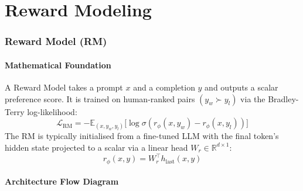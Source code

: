\newpage
\part{Reward Modeling}

\section{Reward Model (RM)}

\subsection{Mathematical Foundation}
A Reward Model takes a prompt $x$ and a completion $y$ and outputs a scalar preference score. It is trained on human-ranked pairs $(y_w \succ y_l)$ via the Bradley-Terry log-likelihood:
\begin{equation}
  \mathcal{L}_{\text{RM}} = -\mathbb{E}_{(x,y_w,y_l)}\bigl[\log\sigma(r_\phi(x,y_w) - r_\phi(x,y_l))\bigr]
\end{equation}
The RM is typically initialised from a fine-tuned LLM with the final token's hidden state projected to a scalar via a linear head $W_r \in \mathbb{R}^{d \times 1}$:
\begin{equation}
  r_\phi(x,y) = W_r^\top h_{\text{last}}(x,y)
\end{equation}

\subsection{Architecture Flow Diagram}

